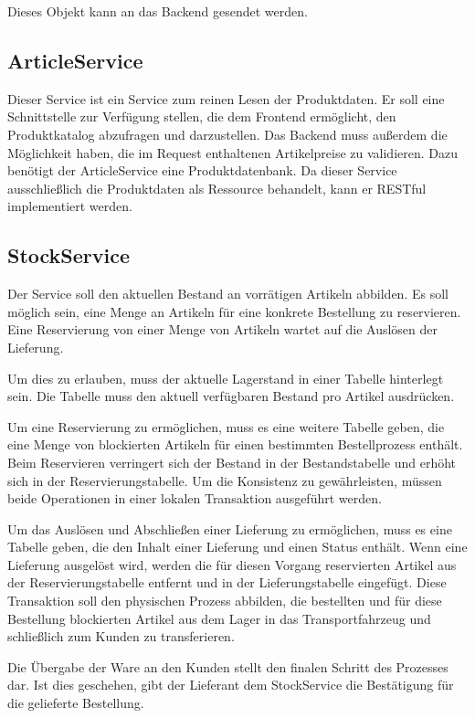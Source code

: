 Dieses Objekt kann an das Backend gesendet werden. 

\subsection{ArticleService}
Dieser Service ist ein Service zum reinen Lesen der Produktdaten. Er soll eine Schnittstelle zur Verfügung stellen, die dem Frontend ermöglicht, den Produktkatalog abzufragen und darzustellen. Das Backend muss außerdem die Möglichkeit haben, die im Request enthaltenen Artikelpreise zu validieren. Dazu benötigt der ArticleService eine Produktdatenbank. Da dieser Service ausschließlich die Produktdaten als Ressource behandelt, kann er RESTful implementiert werden.

\subsection{StockService}
Der Service soll den aktuellen Bestand an vorrätigen Artikeln abbilden. Es soll möglich sein, eine Menge an Artikeln für eine konkrete Bestellung zu reservieren. Eine Reservierung von einer Menge von Artikeln wartet auf die Auslösen der Lieferung.

Um dies zu erlauben, muss der aktuelle Lagerstand in einer Tabelle hinterlegt sein. Die Tabelle muss den aktuell verfügbaren Bestand pro Artikel ausdrücken. 

Um eine Reservierung zu ermöglichen, muss es eine weitere Tabelle geben, die eine Menge von blockierten Artikeln für einen bestimmten Bestellprozess enthält. Beim Reservieren verringert sich der Bestand in der Bestandstabelle und erhöht sich in der Reservierungstabelle. Um die Konsistenz zu gewährleisten, müssen beide Operationen in einer lokalen Transaktion ausgeführt werden. 

Um das Auslösen und Abschließen einer Lieferung zu ermöglichen, muss es eine Tabelle geben, die den Inhalt einer Lieferung und einen Status enthält.
Wenn eine Lieferung ausgelöst wird, werden die für diesen Vorgang reservierten Artikel aus der Reservierungstabelle entfernt und in der Lieferungstabelle eingefügt. Diese Transaktion soll den physischen Prozess abbilden, die bestellten und für diese Bestellung blockierten Artikel aus dem Lager in das Transportfahrzeug und schließlich zum Kunden zu transferieren.

Die Übergabe der Ware an den Kunden stellt den finalen Schritt des Prozesses dar. Ist dies geschehen, gibt der Lieferant dem StockService die Bestätigung für die gelieferte Bestellung.

